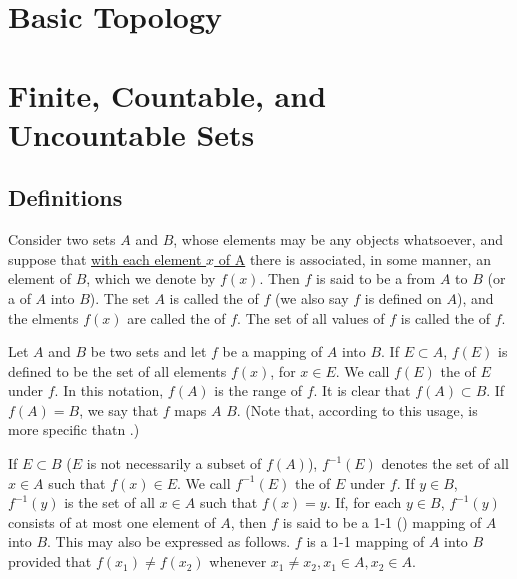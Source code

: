 \section{Basic Topology}

\section{Finite, Countable, and Uncountable Sets}

\subsection{Definitions}
\begin{deff}
	Consider two sets $A$ and $B$, whose elements may be any objects whatsoever, and suppose that {\underline{with each element $x$ of A}} there is associated, in some manner, an element of $B$, which we denote by $f(x)$. Then $f$ is said to be a {} from $A$ to $B$ (or a {} of $A$ into $B$). The set $A$ is called the {} of $f$ (we also say $f$ is defined on $A$), and the elments $f(x)$ are called the {} of $f$. The set of all values of $f$ is called the {} of $f$.
\end{deff}

\begin{deff}\label{def: mapping}
	Let $A$ and $B$ be two sets and let $f$ be a mapping of $A$ into $B$. If $E \subset A$, $f(E)$ is defined to be the set of all elements $f(x)$, for $x \in E$. We call $f(E)$ the {} of $E$ under $f$. In this notation, $f(A)$ is the range of $f$. It is clear that $f(A) \subset B$. If $f(A) = B$, we say that $f$ maps $A$ {} $B$. (Note that, according to this usage, {} is more specific thatn {}.)
\end{deff}

\begin{deff}
	If $E \subset B$ ($E$ is not necessarily a subset of $f(A)$), $f^{-1}(E)$ denotes the set of all $x \in A$ such that $f(x) \in E$. We call $f^{-1}(E)$ the {} of $E$ under $f$. If $y \in B$, $f^{-1}(y)$ is the set of all $x \in A$ such that $f(x) = y$. If, for each $y \in B$, $f^{-1}(y)$ consists of at most one element of $A$, then $f$ is said to be a 1-1 ({}) mapping of $A$ into $B$. This may also be expressed as follows. $f$ is a 1-1 mapping of $A$ into $B$ provided that $f(x_1) \ne f(x_2)$ whenever $x_1 \ne x_2, x_1 \in A, x_2 \in A$.
\end{deff}

